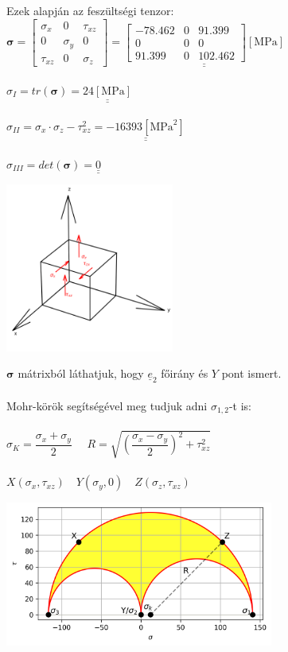 \documentclass[10pt, a4paper]{article}
\newcommand{\ot}{\begin{trivlist}\item[\hskip \labelsep {\bfseries 
			{5. Feladat:}}]\end{trivlist}}
\newcommand{\mpa}{\mathrm{\left[MPa\right]}}
\begin{document}
	Ezek alapján az feszültségi tenzor: $\boldsymbol{\sigma} = 
	\begin{bmatrix}
		\sigma_x & 0 & \tau_{xz}\\
		0 & \sigma_y & 0\\
		\tau_{xz} & 0 & \sigma_z
	\end{bmatrix} = 
	\underline{\underline{\begin{bmatrix}
		-78.462 & 0 & 91.399\\
		0 & 0 & 0\\
		91.399 & 0 & 102.462
	\end{bmatrix} \mpa}}$\\\\
	$\sigma_I = tr(\boldsymbol{\sigma}) = \underline{\underline{24 \mpa}}$\\\\
	$\sigma_{II} = \sigma_x \cdot \sigma_z - \tau^2_{xz} = \underline{\underline{-16393 \left[\text{MPa}^2\right]}}$\\\\
	$\sigma_{III} = det(\boldsymbol{\sigma}) = \underline{\underline{0}}$
	\begin{center}
		\includegraphics[width=157pt]{ kocka.png }
	\end{center}
	\ot
	$\boldsymbol{\sigma}$ mátrixból láthatjuk, hogy $\underline{e}_2$ főirány és $Y$ pont ismert.\\\\
	Mohr-körök segítségével meg tudjuk adni $\sigma_{1,2}$-t is:\\\\
	$\sigma_K = \dfrac{\sigma_x + \sigma_y}{2} \quad$
	$R = \sqrt{\left(\dfrac{\sigma_x - \sigma_y}{2}\right)^2 + \tau^2_{xz}}$\\\\
	$X(\sigma_x,\tau_{xz}) \quad Y(\sigma_y, 0) \quad Z(\sigma_z, \tau_{xz})$\\
	\begin{center}
		\includegraphics[width=250pt]{ Mohr.png }
	\end{center}
\end{document}
